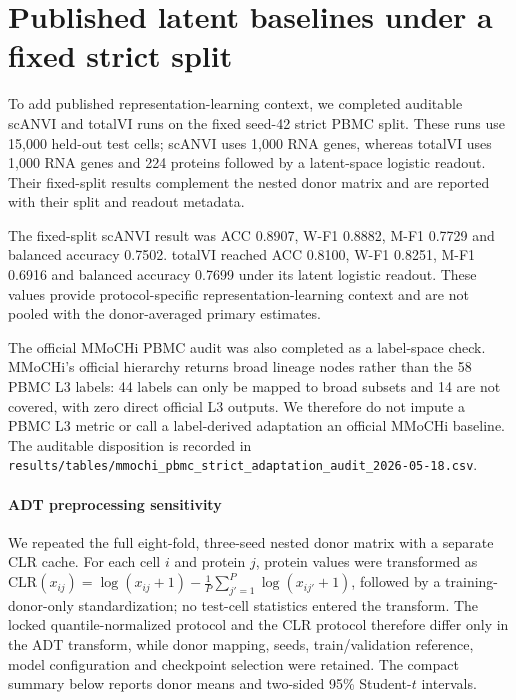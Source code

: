 \documentclass[10pt]{article}
\begin{document}
\section{Published latent baselines under a fixed strict split}

To add published representation-learning context, we completed auditable scANVI and totalVI runs on the fixed seed-42 strict PBMC split. These runs use 15,000 held-out test cells; scANVI uses 1,000 RNA genes, whereas totalVI uses 1,000 RNA genes and 224 proteins followed by a latent-space logistic readout. Their fixed-split results complement the nested donor matrix and are reported with their split and readout metadata.

\begin{table}[H]
\centering
\caption{Protocol-caveated published baselines on a fixed strict PBMC split. Values are test-set metrics from one seed-42 run; the split is not nested donor-LODO and is not pooled with the primary donor-level inference.}
\label{tab:published-fixed-baselines}
\scriptsize
\setlength{\tabcolsep}{2.8pt}
\resizebox{\textwidth}{!}{%

}
\end{table}

The fixed-split scANVI result was ACC 0.8907, W-F1 0.8882, M-F1 0.7729 and balanced accuracy 0.7502. totalVI reached ACC 0.8100, W-F1 0.8251, M-F1 0.6916 and balanced accuracy 0.7699 under its latent logistic readout. These values provide protocol-specific representation-learning context and are not pooled with the donor-averaged primary estimates.

The official MMoCHi PBMC audit was also completed as a label-space check. MMoCHi's official hierarchy returns broad lineage nodes rather than the 58 PBMC L3 labels: 44 labels can only be mapped to broad subsets and 14 are not covered, with zero direct official L3 outputs. We therefore do not impute a PBMC L3 metric or call a label-derived adaptation an official MMoCHi baseline. The auditable disposition is recorded in \texttt{results/tables/mmochi\_pbmc\_strict\_adaptation\_audit\_2026-05-18.csv}.

\paragraph{ADT preprocessing sensitivity}
We repeated the full eight-fold, three-seed nested donor matrix with a separate CLR cache. For each cell $i$ and protein $j$, protein values were transformed as $\mathrm{CLR}(x_{ij})=\log(x_{ij}+1)-\frac{1}{P}\sum_{j'=1}^{P}\log(x_{ij'}+1)$, followed by a training-donor-only standardization; no test-cell statistics entered the transform. The locked quantile-normalized protocol and the CLR protocol therefore differ only in the ADT transform, while donor mapping, seeds, train/validation reference, model configuration and checkpoint selection were retained. The compact summary below reports donor means and two-sided 95\% Student-$t$ intervals.
\end{document}
